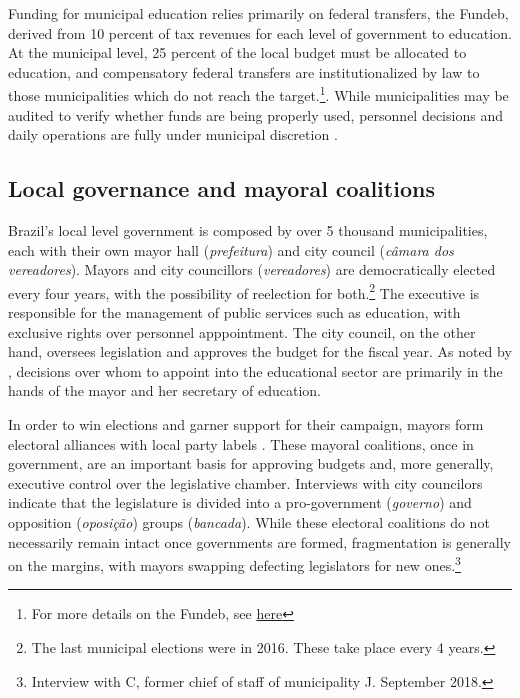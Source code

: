 Funding for municipal education relies primarily on federal transfers, the Fundeb, derived from 10 percent of tax revenues for each level of government to education. At the municipal level, 25 percent of the local budget must be allocated to education, and compensatory federal transfers are institutionalized by law to those municipalities which do not reach the target.\footnote{For more details on the Fundeb, see \hyperlink{https://www.fnde.gov.br/index.php/financiamento/fundeb/sobre-o-plano-ou-programa/sobre-o-fundeb}{here}}. While municipalities may be audited to verify whether funds are being properly used, personnel decisions and daily operations are fully under municipal discretion \citet{ferraz_corrupting_2012}.

\subsection{Local governance and mayoral coalitions}

Brazil's local level government is composed by over 5 thousand municipalities, each with their own mayor hall (\emph{prefeitura}) and city council (\emph{c\^{a}mara dos vereadores}). Mayors and city councillors (\textit{vereadores}) are democratically elected every four years, with the possibility of reelection for both.\footnote{The last municipal elections were in 2016. These take place every 4 years.} The executive is responsible for the management of public services such as education, with exclusive rights over personnel apppointment. The city council, on the other hand, oversees legislation and approves the budget for the fiscal year. As noted by \citet{souza_reforma_2004}, decisions over whom to appoint into the educational sector are primarily in the hands of the mayor and her secretary of education.

In order to win elections and garner support for their campaign, mayors form electoral alliances with local party labels \citet{dantas_eleicoes_2013}. These mayoral coalitions, once in government, are an important basis for approving budgets and, more generally, executive control over the legislative chamber. Interviews with city councilors indicate that the legislature is divided into a pro-government (\textit{governo}) and opposition (\textit{oposição}) groups (\textit{bancada}). While these electoral coalitions do not necessarily remain intact once governments are formed, fragmentation is generally on the margins, with mayors swapping defecting legislators for new ones.\footnote{Interview with C, former chief of staff of municipality J. September 2018.}

